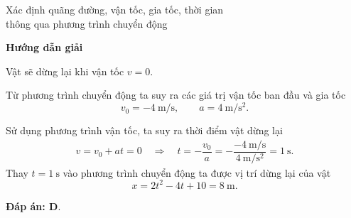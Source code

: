 \begin{dang}{Xác định quãng đường, vận tốc, gia tốc, thời gian \\thông qua phương trình chuyển động }
{	}
	{	\begin{center}
			\textbf{Hướng dẫn giải}
		\end{center}
		
		Vật sẽ dừng lại khi vận tốc $v = 0$.
		
		Từ phương trình chuyển động ta suy ra các giá trị vận tốc ban đầu và gia tốc 
		$$v_0=\SI{-4}{\meter/\second},	\qquad a=\SI{4}{\meter/\second^{2}}.$$
		
		Sử dụng phương trình vận tốc, ta suy ra thời điểm vật dừng lại
		\begin{align*}
			v=v_0+at=0 \quad\Rightarrow\quad t=-\dfrac{v_0}{a}=-\dfrac{\SI{-4}{\meter/	\second}}{\SI{4}{\meter/\second^{2}}}=\SI{1}{\second}.
		\end{align*}		
		Thay $t =\SI{1}{\second}$ vào phương trình chuyển động ta được vị trí dừng lại của vật 
		$$x = 2t^2 - 4t + 10=\SI{8}{\meter}.$$
		
		\textbf{Đáp án: D}.
	}
\end{dang}


